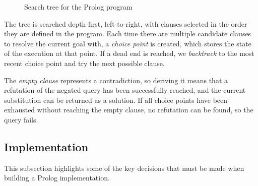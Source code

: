 \begin{figure}[H]
\begin{center}
\end{center}
\caption{Search tree for the Prolog program}
\label{fig:prolog-search-tree}
\end{figure}

The tree is searched depth-first, left-to-right, with clauses selected in the order they are defined in the program. Each time there are multiple candidate clauses to resolve the current goal with, a \emph{choice point} is created, which stores the state of the execution at that point. If a dead end is reached, we \emph{backtrack} to the most recent choice point and try the next possible clause.

The \emph{empty clause} represents a contradiction, so deriving it means that a refutation of the negated query has been successfully reached, and the current substitution can be returned as a solution. If all choice points have been exhausted without reaching the empty clause, no refutation can be found, so the query fails.

\subsection{Implementation}

\label{sec:preparation-implementation}

This subsection highlights some of the key decisions that must be made when building a Prolog implementation.

